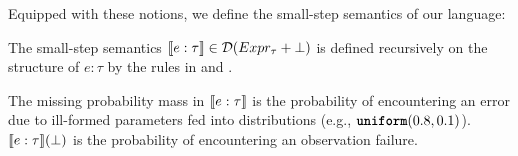  
%
%
%
%
%
Equipped with these notions, we define the small-step semantics of our language:
%
\begin{definition}
	The small-step semantics $\llbracket e :\tau \rrbracket \in \mathcal{D}(Expr_{\tau} + \bot)$ is defined recursively on the structure of $e:\tau$ by the rules in  and . 
\end{definition}
%
The missing probability mass in $\llbracket e :\tau \rrbracket$ is the probability of encountering an error due to ill-formed parameters fed into distributions (e.g., $\textnormal{\ttfamily\bfseries uniform}(0.8,0.1)$). $\llbracket e :\tau \rrbracket(\bot)$ is the probability of encountering an observation failure.

